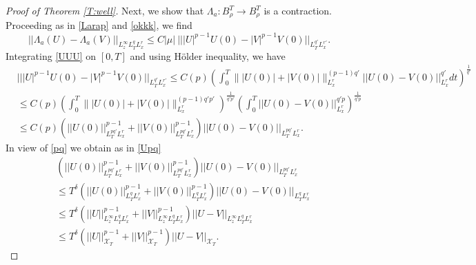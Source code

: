 \documentclass[10pt,a4paper]{amsart}
\newcommand{\XT}{\mathcal{X}_T}
\begin{document}
\begin{proof}[Proof of Theorem \ref{T:well}]
Next, we show that $\Lambda_a: B^T_\rho\to B^T_\rho$ is a contraction. Proceeding as in \eqref{Larap} and \eqref{okkk}, we find
\begin{equation}\label{okkk2}
||\Lambda_a(U) - \Lambda_a(V)||_{L^\infty_{z} L^q_T L^r_x } \le C |\mu| \ |||U|^{p-1} U(0) - |V|^{p-1} V(0)||_{L^{q'}_T L^{r'}_x}.
\end{equation}
Integrating \eqref{UUU} on $[0,T]$ and using H\"older inequality, we have
\begin{align*}
& |||U|^{p-1} U(0) - |V|^{p-1} V(0)||_{L^{q'}_T L^{r'}_x} \le C(p) \left(\int_0^T \big\||U(0)| + |V(0)|\big\|^{(p-1)q'}_{L^{r}_x} ||U(0) - V(0)||^{q'}_{L^{r}_x} dt\right)^{\frac{1}{q'}}
\\
& \le C(p) \left(\int_0^T \big\||U(0)| + |V(0)|\big\|^{(p-1)q' p'}_{L^{r}_x}\right)^{\frac{1}{q'p'}} \left(\int_0^T ||U(0) - V(0)||^{q' p}_{L^{r}_x}\right)^{\frac{1}{q'p}}
\\
& \le C(p) \left(||U(0)||^{p-1}_{L^{pq'}_T L^{r}_x} + ||V(0)||^{p-1}_{L^{pq'}_T L^{r}_x}\right) ||U(0) - V(0)||_{L^{pq'}_T L^{r}_x}.
\end{align*}
In view of \eqref{pq} we obtain as in \eqref{Upq}
\begin{align*}
& \left(||U(0)||^{p-1}_{L^{pq'}_T L^{r}_x} + ||V(0)||^{p-1}_{L^{pq'}_T L^{r}_x}\right) ||U(0) - V(0)||_{L^{pq'}_T L^{r}_x} 
\\
& \le T^{\delta} \left(||U(0)||^{p-1}_{L^{q}_T L^{r}_x} + ||V(0)||^{p-1}_{L^{q}_T L^{r}_x}\right) ||U(0) - V(0)||_{L^{q}_T L^{r}_x}
\\
& \le T^{\delta} \left(||U||^{p-1}_{L^\infty_z L^{q}_T L^{r}_x} + ||V||^{p-1}_{L^\infty_z L^{q}_T L^{r}_x}\right) ||U - V||_{L^\infty_z L^{q}_T L^{r}_x}
\\
& \le T^{\delta} \left(||U||^{p-1}_{\XT} + ||V||^{p-1}_{\XT}\right) ||U - V||_{\XT}.
\end{align*}


\end{proof}
\end{document}
